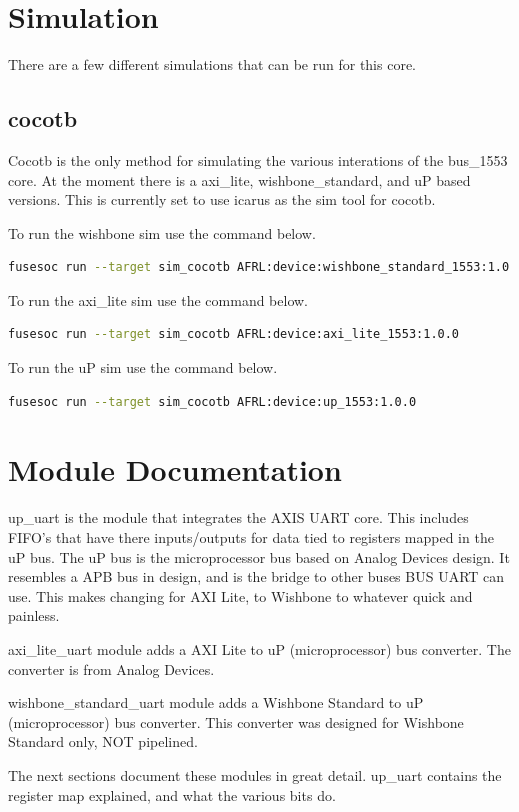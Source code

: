 \newpage

\section{Simulation}
\par
There are a few different simulations that can be run for this core.

\subsection{cocotb}
\par
Cocotb is the only method for simulating the various interations of the bus\_1553 core. At the moment there is a
axi\_lite, wishbone\_standard, and uP based versions. This is currently set to use icarus as the sim tool for cocotb.

\par
To run the wishbone sim use the command below.
\begin{lstlisting}[language=bash]
fusesoc run --target sim_cocotb AFRL:device:wishbone_standard_1553:1.0.0
\end{lstlisting}

\par
To run the axi\_lite sim use the command below.
\begin{lstlisting}[language=bash]
fusesoc run --target sim_cocotb AFRL:device:axi_lite_1553:1.0.0
\end{lstlisting}

\par
To run the uP sim use the command below.
\begin{lstlisting}[language=bash]
fusesoc run --target sim_cocotb AFRL:device:up_1553:1.0.0
\end{lstlisting}


\newpage

\section{Module Documentation} \label{Module Documentation}

\par
up\_uart is the module that integrates the AXIS UART core.
This includes FIFO's that have there inputs/outputs for data tied to registers mapped in the uP bus.
The uP bus is the microprocessor bus based on Analog Devices design. It resembles a APB bus in design,
and is the bridge to other buses BUS UART can use. This makes changing for AXI Lite, to Wishbone to whatever
quick and painless.

\par
axi\_lite\_uart module adds a AXI Lite to uP (microprocessor) bus converter. The converter is
from Analog Devices.

\par
wishbone\_standard\_uart module adds a Wishbone Standard to uP (microprocessor) bus converter. This
converter was designed for Wishbone Standard only, NOT pipelined.

\vspace{15mm}
\par
The next sections document these modules in great detail. up\_uart contains the register map explained, and what the various bits do.

